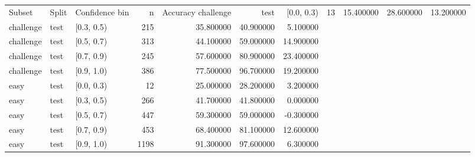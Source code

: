 \begin{tabular}{lllrrrr}
\toprule
Subset & Split & Confidence bin & n & Accuracy %
\midrule
challenge & test & [0.0, 0.3) & 13 & 15.400000 & 28.600000 & 13.200000 \\
challenge & test & [0.3, 0.5) & 215 & 35.800000 & 40.900000 & 5.100000 \\
challenge & test & [0.5, 0.7) & 313 & 44.100000 & 59.000000 & 14.900000 \\
challenge & test & [0.7, 0.9) & 245 & 57.600000 & 80.900000 & 23.400000 \\
challenge & test & [0.9, 1.0) & 386 & 77.500000 & 96.700000 & 19.200000 \\
easy & test & [0.0, 0.3) & 12 & 25.000000 & 28.200000 & 3.200000 \\
easy & test & [0.3, 0.5) & 266 & 41.700000 & 41.800000 & 0.000000 \\
easy & test & [0.5, 0.7) & 447 & 59.300000 & 59.000000 & -0.300000 \\
easy & test & [0.7, 0.9) & 453 & 68.400000 & 81.100000 & 12.600000 \\
easy & test & [0.9, 1.0) & 1198 & 91.300000 & 97.600000 & 6.300000 \\
\bottomrule
\end{tabular}

